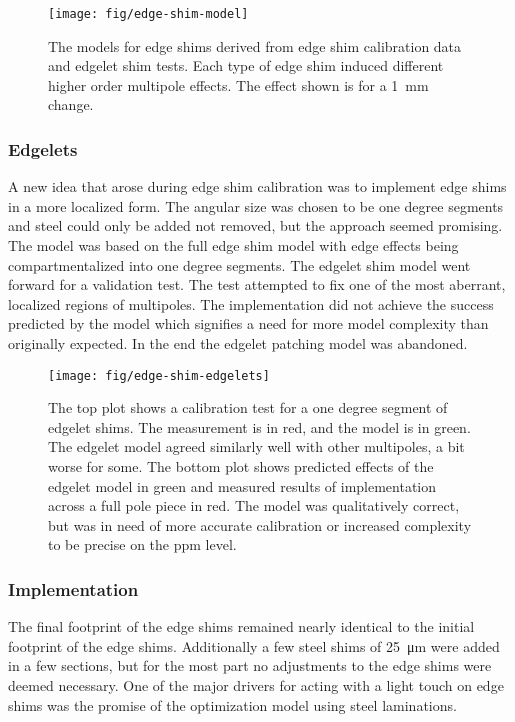\begin{figure}
\centering
\texttt{[image: fig/edge-shim-model]}
\caption{
    The models for edge shims derived from edge shim calibration data and edgelet shim tests.  Each type of edge shim induced different higher order multipole effects.  The effect shown is for a \SI{1}{\milli\meter} change. 
    \label{fig:edge-shim-model}
}
\end{figure}

\subsubsection{Edgelets}

A new idea that arose during edge shim calibration was to implement edge shims in a more localized form.  The angular size was chosen to be one degree segments and steel could only be added not removed, but the approach seemed promising.  The model was based on the full edge shim model with edge effects being compartmentalized into one degree segments.  The edgelet shim model went forward for a validation test.  The test attempted to fix one of the most aberrant, localized regions of multipoles.  The implementation did not achieve the success predicted by the model which signifies a need for more model complexity than originally expected. In the end the edgelet patching model was abandoned.

\begin{figure}
\centering
\texttt{[image: fig/edge-shim-edgelets]}
\caption{
    The top plot shows a calibration test for a one degree segment of edgelet shims.  The measurement is in red, and the model is in green. The edgelet model agreed similarly well with other multipoles, a bit worse for some.  The bottom plot shows predicted effects of the edgelet model in green and measured results of  implementation across a full pole piece in red.  The model was qualitatively correct, but was in need of more accurate calibration or increased complexity to be precise on the ppm level. 
    \label{fig:edge-shim-edgelets}
}
\end{figure}

\subsubsection{Implementation}

The final footprint of the edge shims remained nearly identical to the initial footprint of the edge shims.  Additionally a few steel shims of \SI{25}{\micro \meter} were added in a few sections, but for the most part no adjustments to the edge shims were deemed necessary.  One of the major drivers for acting with a light touch on edge shims was the promise of the optimization model using steel laminations.

